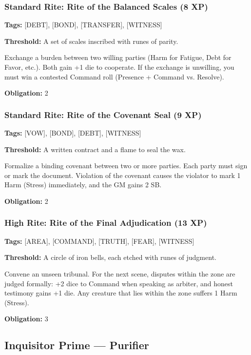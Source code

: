 \subsubsection{Standard Rite: Rite of the Balanced Scales (8 XP)}

\textbf{Tags:} [DEBT], [BOND], [TRANSFER], [WITNESS]

\textbf{Threshold:} A set of scales inscribed with runes of parity.

Exchange a burden between two willing parties (Harm for Fatigue, Debt for Favor, etc.). Both gain +1 die to cooperate. If the exchange is unwilling, you must win a contested Command roll (Presence + Command vs. Resolve).

\textbf{Obligation:} 2

\subsubsection{Standard Rite: Rite of the Covenant Seal (9 XP)}

\textbf{Tags:} [VOW], [BOND], [DEBT], [WITNESS]

\textbf{Threshold:} A written contract and a flame to seal the wax.

Formalize a binding covenant between two or more parties. Each party must sign or mark the document. Violation of the covenant causes the violator to mark 1 Harm (Stress) immediately, and the GM gains 2 SB.

\textbf{Obligation:} 2

\subsubsection{High Rite: Rite of the Final Adjudication (13 XP)}

\textbf{Tags:} [AREA], [COMMAND], [TRUTH], [FEAR], [WITNESS]

\textbf{Threshold:} A circle of iron bells, each etched with runes of judgment.

Convene an unseen tribunal. For the next scene, disputes within the zone are judged formally: +2 dice to Command when speaking as arbiter, and honest testimony gains +1 die. Any creature that lies within the zone suffers 1 Harm (Stress).

\textbf{Obligation:} 3

\subsection{Inquisitor Prime — Purifier}

